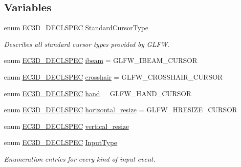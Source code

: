 \subsection*{Variables}
\begin{DoxyCompactItemize}
\item 
enum \mbox{\hyperlink{_common_8h_aac42573e202ca3dd4d259c81691e2369}{E\+C3\+D\+\_\+\+D\+E\+C\+L\+S\+P\+EC}} \mbox{\hyperlink{namespaceec_ab32dc7f72e1021f7625fca2b4693d297}{Standard\+Cursor\+Type}}
\begin{DoxyCompactList}\small\item\em Describes all standard cursor types provided by G\+L\+FW. \end{DoxyCompactList}\item 
enum \mbox{\hyperlink{_common_8h_aac42573e202ca3dd4d259c81691e2369}{E\+C3\+D\+\_\+\+D\+E\+C\+L\+S\+P\+EC}} \mbox{\hyperlink{namespaceec_a11b97e3d63932d34e6fb306f5389cad0}{ibeam}} = G\+L\+F\+W\+\_\+\+I\+B\+E\+A\+M\+\_\+\+C\+U\+R\+S\+OR
\item 
enum \mbox{\hyperlink{_common_8h_aac42573e202ca3dd4d259c81691e2369}{E\+C3\+D\+\_\+\+D\+E\+C\+L\+S\+P\+EC}} \mbox{\hyperlink{namespaceec_a7d6502eddc910822e32f6ba96543bb05}{crosshair}} = G\+L\+F\+W\+\_\+\+C\+R\+O\+S\+S\+H\+A\+I\+R\+\_\+\+C\+U\+R\+S\+OR
\item 
enum \mbox{\hyperlink{_common_8h_aac42573e202ca3dd4d259c81691e2369}{E\+C3\+D\+\_\+\+D\+E\+C\+L\+S\+P\+EC}} \mbox{\hyperlink{namespaceec_ac46e526319ef43480ea56e96f7042e10}{hand}} = G\+L\+F\+W\+\_\+\+H\+A\+N\+D\+\_\+\+C\+U\+R\+S\+OR
\item 
enum \mbox{\hyperlink{_common_8h_aac42573e202ca3dd4d259c81691e2369}{E\+C3\+D\+\_\+\+D\+E\+C\+L\+S\+P\+EC}} \mbox{\hyperlink{namespaceec_a6331d0d47cac81ec8a5104b9c2f647fe}{horizontal\+\_\+resize}} = G\+L\+F\+W\+\_\+\+H\+R\+E\+S\+I\+Z\+E\+\_\+\+C\+U\+R\+S\+OR
\item 
enum \mbox{\hyperlink{_common_8h_aac42573e202ca3dd4d259c81691e2369}{E\+C3\+D\+\_\+\+D\+E\+C\+L\+S\+P\+EC}} \mbox{\hyperlink{namespaceec_a0608ba5ea3b0115a1133083305516b1e}{vertical\+\_\+resize}}
\item 
enum \mbox{\hyperlink{_common_8h_aac42573e202ca3dd4d259c81691e2369}{E\+C3\+D\+\_\+\+D\+E\+C\+L\+S\+P\+EC}} \mbox{\hyperlink{namespaceec_ae2d697393ea83b34b18ab14eb5dacbca}{Input\+Type}}
\begin{DoxyCompactList}\small\item\em Enumeration entries for every kind of input event. \end{DoxyCompactList}\item 

\end{DoxyCompactItemize}
